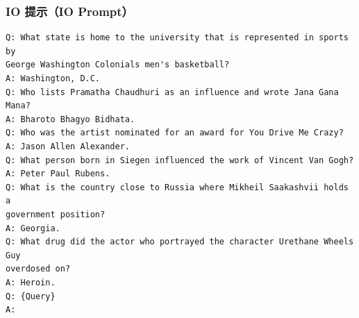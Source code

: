 \documentclass[11pt,UTF8,fontset=fandol]{ctexart}
\begin{document}
\subsubsection{IO 提示（IO Prompt）}
\begin{verbatim}
Q: What state is home to the university that is represented in sports by
George Washington Colonials men's basketball?
A: Washington, D.C.
Q: Who lists Pramatha Chaudhuri as an influence and wrote Jana Gana Mana?
A: Bharoto Bhagyo Bidhata.
Q: Who was the artist nominated for an award for You Drive Me Crazy?
A: Jason Allen Alexander.
Q: What person born in Siegen influenced the work of Vincent Van Gogh?
A: Peter Paul Rubens.
Q: What is the country close to Russia where Mikheil Saakashvii holds a
government position?
A: Georgia.
Q: What drug did the actor who portrayed the character Urethane Wheels Guy
overdosed on?
A: Heroin.
Q: {Query}
A:
\end{verbatim}
\end{document}

